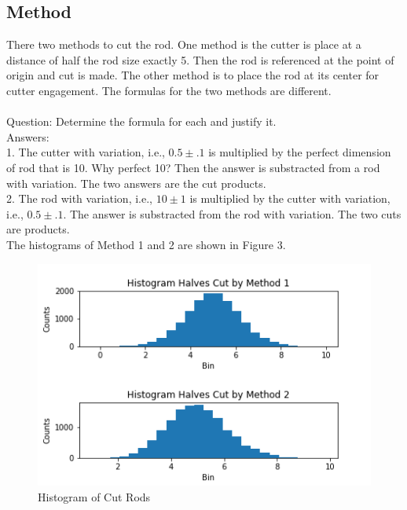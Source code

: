 \documentclass[10pt,journal,compsoc]{IEEEtran} \ifCLASSOPTIONcompsoc
\begin{document}
\noindent \subsection{Method}    There two methods to cut the rod. One method is the cutter is place at  a    distance of half the rod size exactly 5. Then the rod is referenced at the    point of origin and cut is made.  The other method is to place the rod    at its center for cutter engagement. The formulas for the two methods are    different. \\ \\ Question: Determine the formula for each and justify it.
\noindent \\ Answers: \\  1. The cutter with variation, i.e., $0.5 \pm .1$  is    multiplied by the perfect dimension of rod that is 10. Why perfect 10?    Then the answer is substracted from a rod with variation. The two answers    are the cut products.    \\ 2. The rod with variation, i.e., $ 10 \pm 1$ is multiplied by the    cutter with variation, i.e., $0.5 \pm .1$. The answer is substracted from    the rod with variation. The two cuts are products. \\ 
\noindent The histograms of Method 1 and 2 are shown in Figure 3.
\begin{figure}[H]
\centering\includegraphics[width=1\linewidth,height=0.25\textheight]{Fig03}
\caption{Histogram of Cut Rods}
\label{fig:Fig03}
\end{figure}
\end{document}
